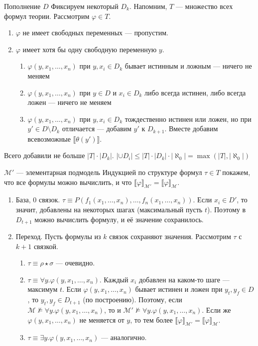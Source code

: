 \documentclass[aspectratio=169]{beamer}
\begin{document}
\begin{frame}{Пополнение $D$}
Фиксируем некоторый $D_k$. Напомним, $T$ --- множество всех формул теории. Рассмотрим $\varphi \in T$.\pause
\begin{enumerate}
\item $\varphi$ не имеет свободных переменных --- пропустим. \pause
\item $\varphi$ имеет хотя бы одну свободную переменную $y$. \pause
\begin{enumerate}
\item $\varphi (y, x_1, \dots, x_n)$ при $y,x_i \in D_k$ бывает истинным и ложным --- ничего не меняем \pause
\item $\varphi (y, x_1, \dots, x_n)$ при $y \in D$ и $x_i \in D_k$ либо всегда истинен, либо всегда ложен --- ничего не меняем \pause
\item $\varphi (y, x_1, \dots, x_n)$ при $y,x_i \in D_k$ тождественно истинен или ложен, но при 
$y' \in D \setminus D_k$ отличается --- добавим $y'$ к $D_{k+1}$. \pause
Вместе добавим всевозможные $\llbracket\theta(y')\rrbracket$.
\end{enumerate}
\end{enumerate}\pause

Всего добавили не больше $|T| \cdot |D_k|$. \pause $|\cup D_i| \le |T| \cdot |D_k| \cdot |\aleph_0| = \max (|T|, |\aleph_0|)$
\end{frame}

\begin{frame}{$\mathcal{M}'$ --- элементарная подмодель}
Индукцией по структуре формул $\tau \in T$ покажем, 
что все формулы можно вычислить, и что $\llbracket \varphi \rrbracket_\mathcal{M'} = \llbracket \varphi \rrbracket_\mathcal{M}$.\pause

\begin{enumerate}
\item База, 0 связок. $\tau \equiv P(f_1(x_1,\dots,x_n),\dots,f_n(x_1,\dots,x_n))$. \pause Если $x_i \in D'$, то значит,
добавлены на некоторых шагах (максимальный пусть $t$). Поэтому в $D_{t+1}$ можно вычислить формулу, и её значение сохранилось. \pause
\item Переход. Пусть формулы из $k$ связок сохраняют значения. Рассмотрим $\tau$ с $k+1$ связкой. \pause
\begin{enumerate}
\item $\tau \equiv \rho \star \sigma$ --- очевидно. \pause
\item $\tau\equiv\forall y.\varphi(y,x_1,\dots,x_n)$. \pause 
Каждый $x_i$ добавлен на каком-то шаге --- максимум $t$. \pause 
Если $\varphi(y,x_1,\dots,x_n)$ бывает истинен и ложен при $y_t, y_f \in D$, то $y_t, y_f \in D_{t+1}$ (по построению). \pause
Поэтому, если $\mathcal{M}\not\models\forall y.\varphi(y,x_1,\dots,x_n)$, то и 
$\mathcal{M'}\not\models\forall y.\varphi(y,x_1,\dots,x_n)$. \pause
Если же $\varphi(y,x_1,\dots,x_n)$ не меняется от $y$, то тем более
$\llbracket \varphi \rrbracket_\mathcal{M'} = \llbracket \varphi \rrbracket_\mathcal{M}$. \pause
\item $\tau\equiv\exists y.\varphi(y,x_1,\dots,x_n)$ --- аналогично.
\end{enumerate}
\end{enumerate}
\end{frame}
\end{document}
